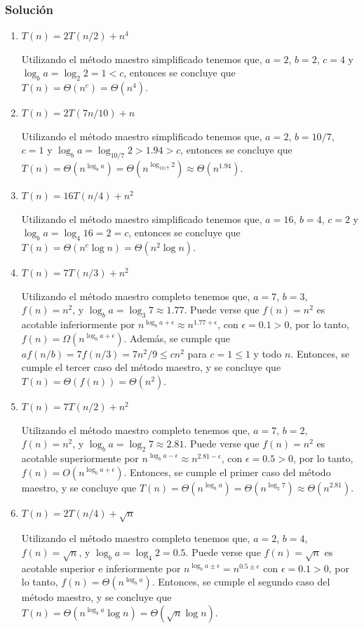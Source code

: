 \documentclass{article}
\begin{document}
\subsubsection*{Solución}
\begin{enumerate}[label=\alph*.]
    \item $T(n) = 2T(n/2) + n^4$
    
    Utilizando el método maestro simplificado tenemos que, $a=2$, $b=2$, $c=4$ y $\log_b a = \log_2 2 = 1 < c$, entonces se concluye que $T(n) = \Theta (n^c) = \Theta (n^4)$.


    \item $T(n) = 2T(7n/10) + n$
    
    Utilizando el método maestro simplificado tenemos que, $a=2$, $b=10/7$, $c=1$ y $\log_b a = \log_{10/7} 2 > 1.94 > c$, entonces se concluye que $T(n) = \Theta (n^{\log_b a}) = \Theta (n^{\log_{10/7} 2}) \approx \Theta (n^{1.94})$.

    
    \item $T(n) = 16T(n/4) + n^2$
    
    Utilizando el método maestro simplificado tenemos que, $a=16$, $b=4$, $c=2$ y $\log_b a = \log_4 16 = 2 = c$, entonces se concluye que $T(n) = \Theta (n^c \log n) = \Theta (n^2 \log n)$.


    \item $T(n) = 7T(n/3) + n^2$
    
    Utilizando el método maestro completo tenemos que, $a=7$, $b=3$, $f(n)=n^2$, y $\log_b a = \log_3 7 \approx 1.77$. Puede verse que $f(n)=n^2$ es acotable inferiormente por $n^{\log_b a + \epsilon} \approx n^{1.77 + \epsilon}$, con $\epsilon = 0.1 > 0$, por lo tanto, $f(n) = \Omega (n^{\log_b a + \epsilon})$. Además, se cumple que $af(n/b) = 7f(n/3) = 7 n^2 / 9 \leq c n^2$ para $c = 1 \leq 1$ y todo $n$. Entonces, se cumple el tercer caso del método maestro, y se concluye que $T(n) = \Theta (f(n)) = \Theta (n^2)$.


    \item $T(n) = 7T(n/2) + n^2$
    
    Utilizando el método maestro completo tenemos que, $a=7$, $b=2$, $f(n)=n^2$, y $\log_b a = \log_2 7 \approx 2.81$. Puede verse que $f(n)=n^2$ es acotable superiormente por $n^{\log_b a - \epsilon} \approx n^{2.81 - \epsilon}$, con $\epsilon = 0.5 > 0$, por lo tanto, $f(n) = O(n^{\log_b a + \epsilon})$. Entonces, se cumple el primer caso del método maestro, y se concluye que $T(n) = \Theta (n^{\log_b a}) = \Theta (n^{\log_2 7}) \approx \Theta (n^{2.81})$.


    \item $T(n) = 2T(n/4) + \sqrt{n}$
    
    Utilizando el método maestro completo tenemos que, $a=2$, $b=4$, $f(n)=\sqrt{n}$, y $\log_b a = \log_4 2 = 0.5$. Puede verse que $f(n)=\sqrt{n}$ es acotable superior e inferiormente por $n^{\log_b a \pm \epsilon} = n^{0.5 \pm \epsilon}$ con $\epsilon = 0.1 > 0$, por lo tanto, $f(n) = \Theta (n^{\log_b a})$. Entonces, se cumple el segundo caso del método maestro, y se concluye que $T(n) = \Theta(n^{\log_b a} \log n) = \Theta (\sqrt{n} \log n)$.

\end{enumerate}
\end{document}
